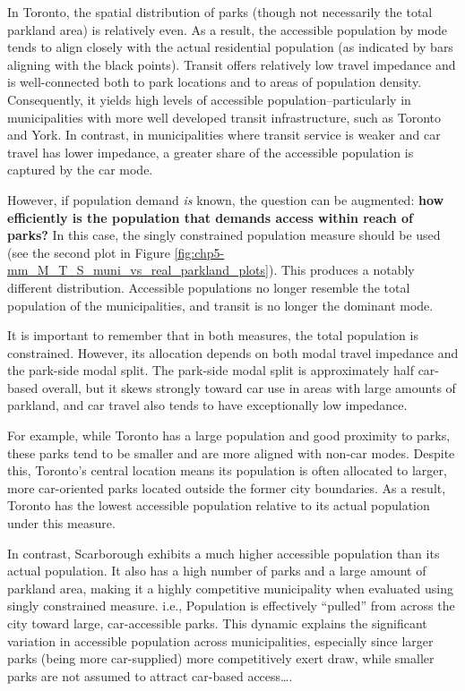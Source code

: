 \documentclass[
11pt, %
oneside, %
english, %
singlespacing, %
]{macthesis} %
\begin{document}
In Toronto, the spatial distribution of parks (though not necessarily the total parkland area) is relatively even. As a result, the accessible population by mode tends to align closely with the actual residential population (as indicated by bars aligning with the black points). Transit offers relatively low travel impedance and is well-connected both to park locations and to areas of population density. Consequently, it yields high levels of accessible population--particularly in municipalities with more well developed transit infrastructure, such as Toronto and York. In contrast, in municipalities where transit service is weaker and car travel has lower impedance, a greater share of the accessible population is captured by the car mode.

However, if population demand \emph{is} known, the question can be augmented: \textbf{how efficiently is the population that demands access within reach of parks?} In this case, the singly constrained population measure should be used (see the second plot in Figure \ref{fig:chp5-mm_M_T_S_muni_vs_real_parkland_plots}). This produces a notably different distribution. Accessible populations no longer resemble the total population of the municipalities, and transit is no longer the dominant mode.

It is important to remember that in both measures, the total population is constrained. However, its allocation depends on both modal travel impedance and the park-side modal split. The park-side modal split is approximately half car-based overall, but it skews strongly toward car use in areas with large amounts of parkland, and car travel also tends to have exceptionally low impedance.

For example, while Toronto has a large population and good proximity to parks, these parks tend to be smaller and are more aligned with non-car modes. Despite this, Toronto's central location means its population is often allocated to larger, more car-oriented parks located outside the former city boundaries. As a result, Toronto has the lowest accessible population relative to its actual population under this measure.

In contrast, Scarborough exhibits a much higher accessible population than its actual population. It also has a high number of parks and a large amount of parkland area, making it a highly competitive municipality when evaluated using singly constrained measure. i.e., Population is effectively ``pulled'' from across the city toward large, car-accessible parks. This dynamic explains the significant variation in accessible population across municipalities, especially since larger parks (being more car-supplied) more competitively exert draw, while smaller parks are not assumed to attract car-based access\ldots.
\end{document}
